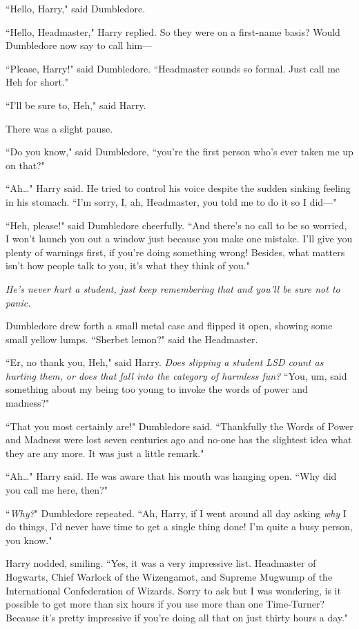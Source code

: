 ``Hello, Harry," said Dumbledore.

``Hello, Headmaster," Harry replied. So they were on a first-name basis? Would Dumbledore now say to call him—

``Please, Harry!" said Dumbledore. ``Headmaster sounds so formal. Just call me Heh for short."

``I'll be sure to, Heh," said Harry.

There was a slight pause.

``Do you know," said Dumbledore, ``you're the first person who's ever taken me up on that?"

``Ah…" Harry said. He tried to control his voice despite the sudden sinking feeling in his stomach. ``I'm sorry, I, ah, Headmaster, you told me to do it so I did—"

``Heh, please!" said Dumbledore cheerfully. ``And there's no call to be so worried, I won't launch you out a window just because you make one mistake. I'll give you plenty of warnings first, if you're doing something wrong! Besides, what matters isn't how people talk to you, it's what they think of you."

\emph{He's never hurt a student, just keep remembering that and you'll be sure not to panic.}

Dumbledore drew forth a small metal case and flipped it open, showing some small yellow lumps. ``Sherbet lemon?" said the Headmaster.

``Er, no thank you, Heh," said Harry. \emph{Does slipping a student LSD count as hurting them, or does that fall into the category of harmless fun?} ``You, um, said something about my being too young to invoke the words of power and madness?"

``That you most certainly are!" Dumbledore said. ``Thankfully the Words of Power and Madness were lost seven centuries ago and no-one has the slightest idea what they are any more. It was just a little remark."

``Ah…" Harry said. He was aware that his mouth was hanging open. ``Why did you call me here, then?"

``\emph{Why?}" Dumbledore repeated. ``Ah, Harry, if I went around all day asking \emph{why} I do things, I'd never have time to get a single thing done! I'm quite a busy person, you know."

Harry nodded, smiling. ``Yes, it was a very impressive list. Headmaster of Hogwarts, Chief Warlock of the Wizengamot, and Supreme Mugwump of the International Confederation of Wizards. Sorry to ask but I was wondering, is it possible to get more than six hours if you use more than one Time-Turner? Because it's pretty impressive if you're doing all that on just thirty hours a day."

